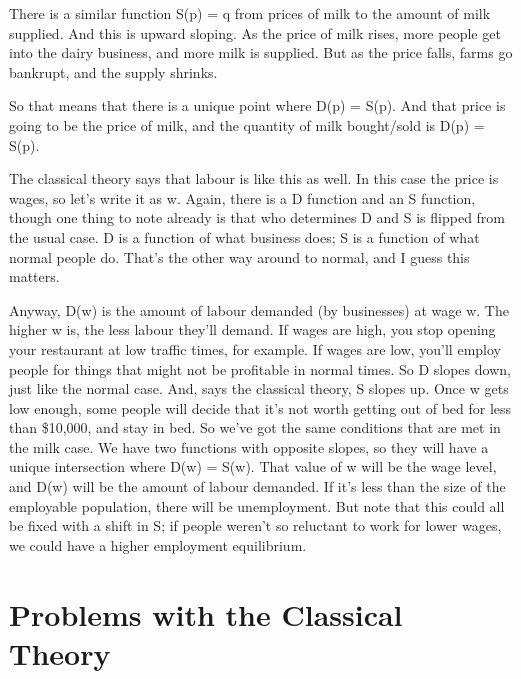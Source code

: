 \documentclass[
  11pt,
  letterpaper,
  DIV=11,
  numbers=noendperiod,
  oneside]{scrartcl}
\begin{document}
There is a similar function S(p) = q from prices of milk to the amount
of milk supplied. And this is upward sloping. As the price of milk
rises, more people get into the dairy business, and more milk is
supplied. But as the price falls, farms go bankrupt, and the supply
shrinks.

So that means that there is a unique point where D(p) = S(p). And that
price is going to be the price of milk, and the quantity of milk
bought/sold is D(p) = S(p).

The classical theory says that labour is like this as well. In this case
the price is wages, so let's write it as w. Again, there is a D function
and an S function, though one thing to note already is that who
determines D and S is flipped from the usual case. D is a function of
what business does; S is a function of what normal people do. That's the
other way around to normal, and I guess this matters.

Anyway, D(w) is the amount of labour demanded (by businesses) at wage w.
The higher w is, the less labour they'll demand. If wages are high, you
stop opening your restaurant at low traffic times, for
example. If wages
are low, you'll employ people for things that might not be profitable in
normal times. So D slopes down, just like the normal
case. And, says the classical theory, S slopes up. Once w gets low
enough, some people will decide that it's not worth getting out of bed
for less than \$10,000, and stay in bed. So we've got the same
conditions that are met in the milk case. We have two functions with
opposite slopes, so they will have a unique intersection where D(w) =
S(w). That value of w will be the wage level, and D(w) will be the
amount of labour demanded. If it's less than the size of the employable
population, there will be unemployment. But note that this could all be
fixed with a shift in S; if people weren't so reluctant to work for
lower wages, we could have a higher employment equilibrium.

\section{Problems with the Classical
Theory}\label{problems-with-the-classical-theory}
\end{document}
